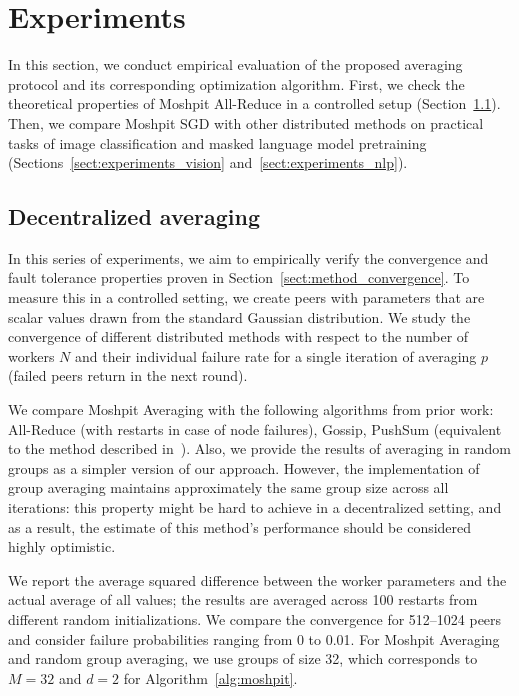 \vspace{-10pt}
\section{Experiments}\label{sect:experiments}
\vspace{-2pt}
In this section, we
conduct empirical evaluation of the proposed averaging protocol and its corresponding optimization algorithm. 
First, we check the theoretical properties of Moshpit All-Reduce in a controlled setup (Section~\ref{sect:experiments_averaging}). Then, we compare Moshpit SGD with other distributed methods on practical tasks of image classification and masked language model pretraining (Sections~\ref{sect:experiments_vision} and~\ref{sect:experiments_nlp}).

\vspace{-4pt}
\subsection{Decentralized averaging}
\label{sect:experiments_averaging}
In this series of experiments, we aim to empirically verify the convergence and fault tolerance properties proven in Section~\ref{sect:method_convergence}.
To measure this in a controlled setting, we create peers with parameters that are scalar values drawn from the standard Gaussian distribution. We study the convergence of different distributed methods with respect to the number of workers $N$ and their individual failure rate for a single iteration of averaging $p$  (failed peers return in the next round). 

We compare Moshpit Averaging with the following algorithms from prior work: All-Reduce (with restarts in case of node failures), Gossip, PushSum (equivalent to the method described in~\cite{sgpush}). Also, we provide the results of averaging in random groups as a simpler version of our approach. However, the implementation of group averaging maintains approximately the same group size across all iterations: this property might be hard to achieve in a decentralized setting, and as a result, the estimate of this method's performance should be considered highly optimistic.

We report the average squared difference between the worker parameters and the actual average of all values; the results are averaged across 100 restarts from different random initializations.
We compare the convergence for 512--1024 peers and consider failure probabilities ranging from 0 to 0.01. For Moshpit Averaging and random group averaging, we use groups of size 32, which corresponds to $M=32$ and $d=2$ for Algorithm~\ref{alg:moshpit}.


